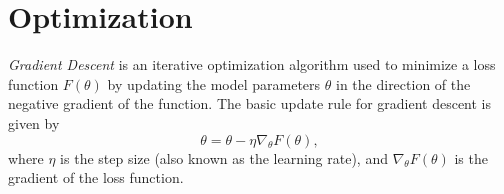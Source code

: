 \section{Optimization}

\begin{definition}
  \textit{Gradient Descent} \autocite{sun2020optimization} \autocite{ruder2017overviewgradientdescentoptimization} is an iterative optimization algorithm used to minimize a loss function \( F(\theta) \) by updating the model parameters \( \theta \) in the direction of the negative gradient of the function. The basic update rule for gradient descent is given by
  \[
    \theta = \theta - \eta \nabla_\theta F(\theta),
  \]
  where \( \eta \) is the step size (also known as the learning rate), and \( \nabla_\theta F(\theta) \) is the gradient of the loss function.
\end{definition}

